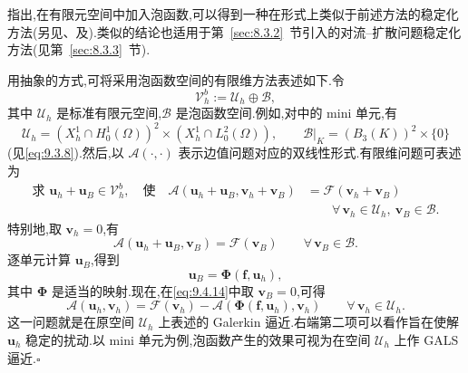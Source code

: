 \begin{note}
指出,在有限元空间中加入泡函数,可以得到一种在形式上类似于前述方法的稳定化方法(另见、及).类似的结论也适用于第~\ref{sec:8.3.2}~节引入的对流--扩散问题稳定化方法(见第~\ref{sec:8.3.3}~节).

用抽象的方式,可将采用泡函数空间的有限维方法表述如下.令
\[
  \mathcal V_h^b:=\mathcal U_h\oplus\mathcal B,
\]
其中 \(\mathcal U_h\) 是标准有限元空间,\(\mathcal B\) 是泡函数空间.例如,对中的 mini 单元,有
\begin{equation}\label{eq:9.4.13}
  \mathcal U_h=(X_h^1\cap H_0^1(\Omega))^2\times(X_h^1\cap L_0^2(\Omega)),
      \qquad \mathcal B|_K=(B_3(K))^2\times\{0\}
\end{equation}
(见\eqref{eq:9.3.8}).然后,以 \(\mathcal A(\cdot,\cdot)\) 表示边值问题对应的双线性形式.有限维问题可表述为
\begin{equation}\label{eq:9.4.14}
  \begin{aligned}
    \text{求 }\boldsymbol{u}_h+\boldsymbol{u}_B\in\mathcal V_h^b,\quad\text{使}\quad
     \mathcal A(\boldsymbol{u}_h+\boldsymbol{u}_B,\boldsymbol{v}_h+\boldsymbol{v}_B)
       &=\mathcal F(\boldsymbol{v}_h+\boldsymbol{v}_B)\\
       &\qquad\forall\,\boldsymbol{v}_h\in\mathcal U_h,\ \boldsymbol{v}_B\in\mathcal B.
  \end{aligned}
\end{equation}
特别地,取 \(\boldsymbol{v}_h=0\),有
\[
  \mathcal A(\boldsymbol{u}_h+\boldsymbol{u}_B,\boldsymbol{v}_B)
       =\mathcal F(\boldsymbol{v}_B)\qquad\forall\,\boldsymbol{v}_B\in\mathcal B.
\]
逐单元计算 \(\boldsymbol{u}_B\),得到
\begin{equation}\label{eq:9.4.15}
  \boldsymbol{u}_B=\boldsymbol{\Phi}(\boldsymbol{f},\boldsymbol{u}_h),
\end{equation}
其中 \(\boldsymbol{\Phi}\) 是适当的映射.现在,在\eqref{eq:9.4.14}中取 \(\boldsymbol{v}_B=0\),可得
\begin{equation}\label{eq:9.4.16}
  \mathcal A(\boldsymbol{u}_h,\boldsymbol{v}_h)
    =\mathcal F(\boldsymbol{v}_h)-\mathcal A(\boldsymbol{\Phi}(\boldsymbol{f},\boldsymbol{u}_h),\boldsymbol{v}_h)
         \qquad\forall\,\boldsymbol{v}_h\in\mathcal U_h .
\end{equation}
这一问题就是在原空间 \(\mathcal U_h\) 上表述的 Galerkin 逼近.右端第二项可以看作旨在使解 \(\boldsymbol{u}_h\) 稳定的扰动.以 mini 单元为例,泡函数产生的效果可视为在空间 \(\mathcal U_h\) 上作 GALS 逼近.\hfill\(\square\)
\end{note}

